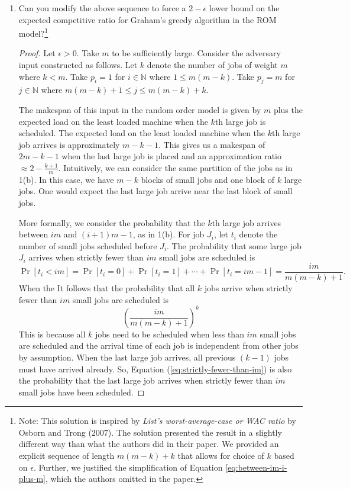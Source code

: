\documentclass[11pt]{article}
\begin{document}
\begin{enumerate}[leftmargin=16pt]
\begin{enumerate}[leftmargin=16pt]
        \item Can you modify the above sequence to force a $2-\epsilon$ lower bound on the expected competitive ratio for Graham's greedy algorithm in the ROM model?\footnote{Note: This solution is inspired by \textit{List's worst-average-case or WAC ratio} by Osborn and Trong (2007). The solution presented the result in a slightly different way than what the authors did in their paper. We provided an explicit sequence of length $m(m-k)+k$ that allows for choice of $k$ based on $\epsilon$. Further, we justified the simplification of Equation \ref{eq:between-im-i-plus-m}, which the authors omitted in the paper.}
        \begin{proof}
            Let $\epsilon > 0$. Take $m$ to be sufficiently large. Consider the adversary input constructed as follows. Let $k$ denote the number of jobs of weight $m$ where $k < m$. Take $p_i = 1$ for $i \in \mathbb{N}$ where $1 \leq m(m-k)$. Take $p_j = m$ for $j \in \mathbb{N}$ where $m(m-k)+1 \leq j \leq m(m-k)+k$.
            
            The makespan of this input in the random order model is given by $m$ plus the expected load on the least loaded machine when the $k$th large job is scheduled. The expected load on the least loaded machine when the $k$th large job arrives is approximately $m-k-1$. This gives us a makespan of $2m - k -1$ when the last large job is placed and an approximation ratio $\approx 2 - \frac{k+1}{m}$. Intuitively, we can consider the same partition of the jobs as in 1(b). In this case, we have $m-k$ blocks of small jobs and one block of $k$ large jobs. One would expect the last large job arrive near the last block of small jobs.
            
            More formally, we consider the probability that the $k$th large job arrives between $im$ and $(i+1)m-1$, as in 1(b). For job $J_i$, let $t_i$ denote the number of small jobs scheduled before $J_i$. The probability that some large job $J_i$ arrives when strictly fewer than $im$ small jobs are scheduled is
            $$
            \Pr[t_i < im] = \Pr[t_i=0] + \Pr[t_i=1] + \cdots + \Pr[t_i=im-1] = \frac{im}{m(m-k)+1}.
            $$
            When the It follows that the probability that all $k$ jobs arrive when strictly fewer than $im$ small jobs are scheduled is
            \begin{equation} \label{eq:strictly-fewer-than-im}
                \left( \frac{im}{m(m-k)+1} \right)^k
            \end{equation}
            This is because all $k$ jobs need to be scheduled when less than $im$ small jobs are scheduled and the arrival time of each job is independent from other jobs by assumption. When the last large job arrives, all previous $(k-1)$ jobs must have arrived already. So, Equation (\ref{eq:strictly-fewer-than-im}) is also the probability that the last large job arrives when strictly fewer than $im$ small jobs have been scheduled.
            

\end{proof}
\end{enumerate}
\end{enumerate}
\end{document}
